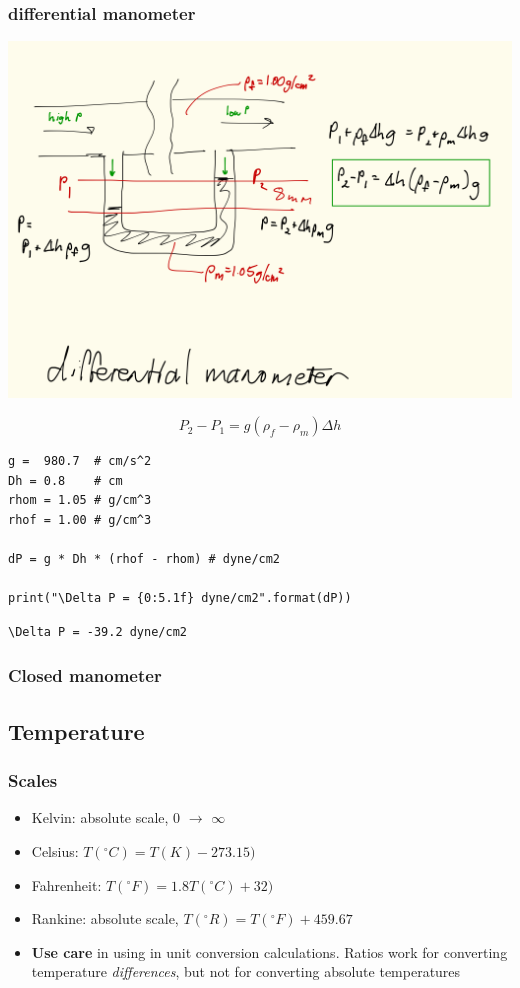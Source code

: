 \documentclass[11pt]{article}
\begin{document}
\subsubsection{differential manometer}
\label{sec-4-6-5}
\includegraphics[width=.9\linewidth]{./figs/Manometer-diff.png}

\[ P_{2}- P_{1} = g(\rho_{f} - \rho_{m}) \Delta h \]

\begin{verbatim}
g =  980.7  # cm/s^2
Dh = 0.8    # cm
rhom = 1.05 # g/cm^3
rhof = 1.00 # g/cm^3

dP = g * Dh * (rhof - rhom) # dyne/cm2

print("\Delta P = {0:5.1f} dyne/cm2".format(dP))
\end{verbatim}

\begin{verbatim}
\Delta P = -39.2 dyne/cm2
\end{verbatim}

\subsubsection{Closed manometer}
\label{sec-4-6-6}
\subsection{Temperature}
\label{sec-4-7}
\subsubsection{Scales}
\label{sec-4-7-1}
\begin{itemize}
\item Kelvin: absolute scale, 0 $\to$ $\infty$
\item Celsius: \(T(^{\circ}C) = T(K) - 273.15)\)
\item Fahrenheit: \(T(^{\circ}F) = 1.8 T(^{\circ}C) + 32 )\)
\item Rankine: absolute scale, \(T(^{\circ}R) = T(^{\circ}F)+459.67\)
\item \textbf{Use care} in using in unit conversion calculations.  Ratios work for converting temperature \emph{differences}, but not for converting absolute temperatures
\end{itemize}
\end{document}
